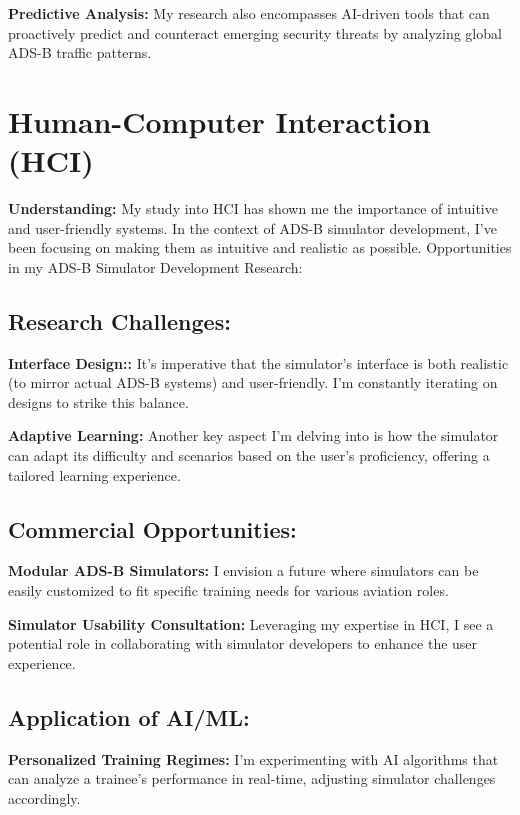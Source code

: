 \documentclass[11pt,journal,compsoc]{article}
\begin{document}
\textbf{Predictive Analysis:} My research also encompasses AI-driven tools that can proactively predict and counteract emerging security threats by analyzing global ADS-B traffic patterns.



\section{Human-Computer Interaction (HCI)}

\textbf{Understanding:} My study into HCI has shown me the importance of intuitive and user-friendly systems. In the context of ADS-B simulator development, I've been focusing on making them as intuitive and realistic as possible.
Opportunities in my ADS-B Simulator Development Research:

\subsection{Research Challenges:}


\textbf{Interface Design::} It's imperative that the simulator's interface is both realistic (to mirror actual ADS-B systems) and user-friendly. I'm constantly iterating on designs to strike this balance.


\textbf{Adaptive Learning:} Another key aspect I'm delving into is how the simulator can adapt its difficulty and scenarios based on the user's proficiency, offering a tailored learning experience.

\subsection{Commercial Opportunities:}


\textbf{Modular ADS-B Simulators:}  I envision a future where simulators can be easily customized to fit specific training needs for various aviation roles.

\textbf{Simulator Usability Consultation:} Leveraging my expertise in HCI, I see a potential role in collaborating with simulator developers to enhance the user experience.



\subsection{Application of AI/ML:}

\textbf{Personalized Training Regimes:} I'm experimenting with AI algorithms that can analyze a trainee's performance in real-time, adjusting simulator challenges accordingly.
\end{document}

